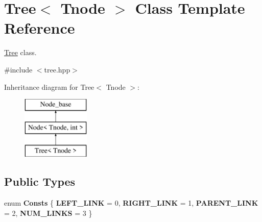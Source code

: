 \hypertarget{classTree}{}\section{Tree$<$ Tnode $>$ Class Template Reference}
\label{classTree}


\hyperlink{classTree}{Tree} class.  




{\ttfamily \#include $<$tree.\+hpp$>$}

Inheritance diagram for Tree$<$ Tnode $>$\+:\begin{figure}[H]
\begin{center}
\leavevmode
\includegraphics[height=3.000000cm]{classTree}
\end{center}
\end{figure}
\subsection*{Public Types}
\begin{DoxyCompactItemize}
\item 
enum {\bfseries Consts} \{ {\bfseries L\+E\+F\+T\+\_\+\+L\+I\+NK} = 0, 
{\bfseries R\+I\+G\+H\+T\+\_\+\+L\+I\+NK} = 1, 
{\bfseries P\+A\+R\+E\+N\+T\+\_\+\+L\+I\+NK} = 2, 
{\bfseries N\+U\+M\+\_\+\+L\+I\+N\+KS} = 3
 \}\hypertarget{classTree_a8d1e12815beb46a052311a85390f3d37}{}\label{classTree_a8d1e12815beb46a052311a85390f3d37}

\end{DoxyCompactItemize}
